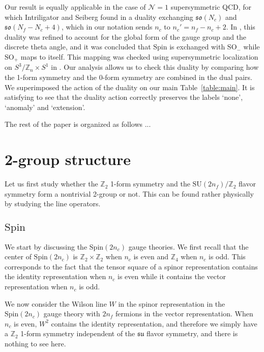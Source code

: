\documentclass[12pt]{article}
\numberwithin{equation}{section}
\def\Nequals#1{$\mathcal{N}{=}#1$}
\def\bZ{\mathbb{Z}}
\def\SU{\mathrm{SU}}
\def\SO{\mathrm{SO}}
\def\su{\mathfrak{su}}
\def\so{\mathfrak{so}}
\def\Spin{\mathrm{Spin}}
\begin{document}
Our result is equally applicable in the case of \Nequals1 supersymmetric QCD, for which
Intriligator and Seiberg found in \cite{Intriligator:1995id} a duality exchanging $\so(N_c)$ and $\so(N_f-N_c+4)$,
which in our notation sends $n_c$ to $n_c'=n_f-n_c+2$.
In \cite{Aharony:2013hda}, this duality was refined to account for the global form of the gauge group and the discrete theta angle, and it was concluded that $\Spin$ is exchanged with $\SO_-$ while $\SO_+$ maps to itself.
This mapping was checked using supersymmetric localization on $S^3/\bZ_n \times S^1$ in \cite{Razamat:2013opa}.
Our analysis allows us to check this duality by comparing how the 1-form symmetry and the 0-form symmetry are combined in the dual pairs.
We superimposed the action of the duality on our main Table~\ref{table:main}.
It is satisfying to see that the duality action correctly preserves the labels `none', `anomaly' and `extension'.

The rest of the paper is organized as follows ...

\section{2-group structure}
Let us first study whether the $\bZ_2$ 1-form symmetry and the $\SU(2n_f)/\bZ_2$ flavor symmetry form a nontrivial 2-group or not. 
This can be found rather physically by studying the line operators. 

\subsection{$\Spin$}
We start by discussing the $\Spin(2n_c)$ gauge theories. 
We first recall that the center of $\Spin(2n_c)$ is $\bZ_2\times \bZ_2$ when $n_c$ is even and $\bZ_4$ when $n_c$ is odd.
This corresponds to the fact that the tensor square of a spinor representation contains the identity representation when $n_c$ is even while it contains the vector representation when $n_c$ is odd.

We now consider the Wilson line $W$ in the spinor representation in the $\Spin(2n_c)$ gauge theory with $2n_f$ fermions in the vector representation.
When $n_c$ is even, $W^2$ contains the identity representation, and therefore we simply have a $\bZ_2$ 1-form symmetry independent of the $\su$ flavor symmetry, and there is nothing to see here.
\end{document}
